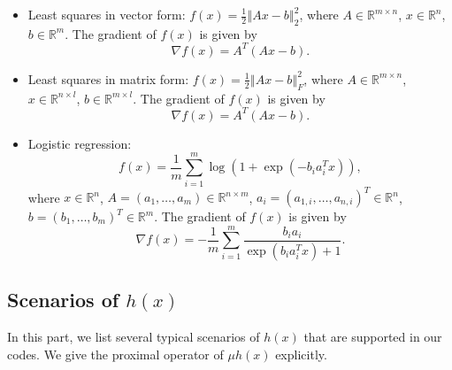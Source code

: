 \documentclass[a4paper]{article}
\newcommand{\norm}[1]{\left\Vert#1\right\Vert}
\newcommand{\mr}{\mathbb{R}}
\begin{document}
\begin{itemize}
  \item {Least squares in vector form:} $f(x) = \frac{1}{2} 
  \norm{Ax - b}_2^2$, where $A \in \mr^{m \times n}$, $x \in \mr^n$, 
  $b 
  \in \mr^m$. The gradient of $f(x)$ is given by %
  \begin{displaymath}
    \nabla f(x) = A^T (A x - b).
  \end{displaymath}
  
  \item {Least squares in matrix form:} $f(x) = \frac{1}{2} 
  \norm{Ax - b}_F^2$, where $A \in \mr^{m \times n}$, $x \in \mr^{n 
    \times l}$, $b \in \mr^{m \times l}$. The gradient of $f(x)$ is 
  given 
  by
  \begin{displaymath}
    \nabla f(x) = A^T  (A x - b).
  \end{displaymath}
  
  \item {Logistic regression:} 
  \begin{displaymath}
    f(x) = \frac{1}{m} \sum_{i = 1}^{m} \log(1 + \exp(- b_i a_i^T x)),
  \end{displaymath}
  where $x \in \mr^n$, $A = (a_1, \ldots, a_m) \in \mr^{n \times m}$, 
  $a_i = (a_{1,i}, \ldots, a_{n,i})^T \in \mr^n$,
  $b = (b_1, \ldots, b_m)^T \in \mr^m$. The gradient of $f(x)$ is 
  given 
  by
  \begin{displaymath}
    \nabla f(x) = - \frac{1}{m} \sum_{i = 1}^{m} \frac{b_i 
      a_i}{\exp(b_i a_i^T x) + 1}.
  \end{displaymath}
\end{itemize}



\subsection{Scenarios of $h(x)$}
\label{sec:cal_h}
In this part, we list several typical scenarios of $h(x)$ that are 
supported in our codes. We give the proximal operator of $\mu h(x)$ 
explicitly.
\end{document}
